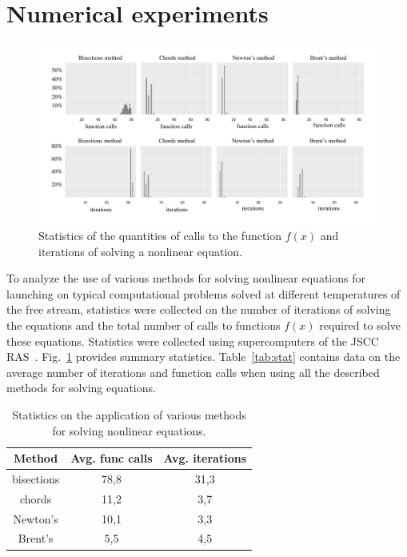 \documentclass[
11pt,%
tightenlines,%
twoside,%
onecolumn,%
nofloats,%
nobibnotes,%
nofootinbib,%
superscriptaddress,%
noshowpacs,%
centertags]%
{revtex4}
\begin{document}
\section{Numerical experiments}

\begin{figure}[h!]
\setcaptionmargin{5mm}
\onelinecaptionstrue
\includegraphics[width=1\textwidth]{pics/stat.pdf}
\caption{Statistics of the quantities of calls to the function $f(x)$ and iterations of solving a nonlinear equation.}\label{fig:stat}
\end{figure}

To analyze the use of various methods for solving nonlinear equations for launching on typical computational problems solved at different temperatures of the free stream, statistics were collected on the number of iterations of solving the equations and the total number of calls to functions $f(x)$ required to solve these equations.
Statistics were collected using supercomputers of the JSCC RAS~\cite{JSCC_Supercomputers}.
Fig.~\ref{fig:stat} provides summary statistics.
Table~\ref{tab:stat} contains data on the average number of iterations and function calls when using all the described methods for solving equations.

\begin{table}[h!]
\label{tbl:supercomputers}
\setcaptionmargin{0mm}
\onelinecaptionsfalse
{}
\caption{Statistics on the application of various methods for solving nonlinear equations.}\label{tab:stat}
\bigskip
\begin{tabular}{|c|c|c|}
\hline
Method & Avg. func calls & Avg. iterations \\
\hline
bisections & 78,8 & 31,3 \\
\hline
chords & 11,2 & 3,7 \\
\hline
Newton's & 10,1 & 3,3 \\
\hline
Brent's & 5,5 & 4,5 \\
\hline
\end{tabular}
\label{tab:supercomputers}
\end{table}
\end{document}
